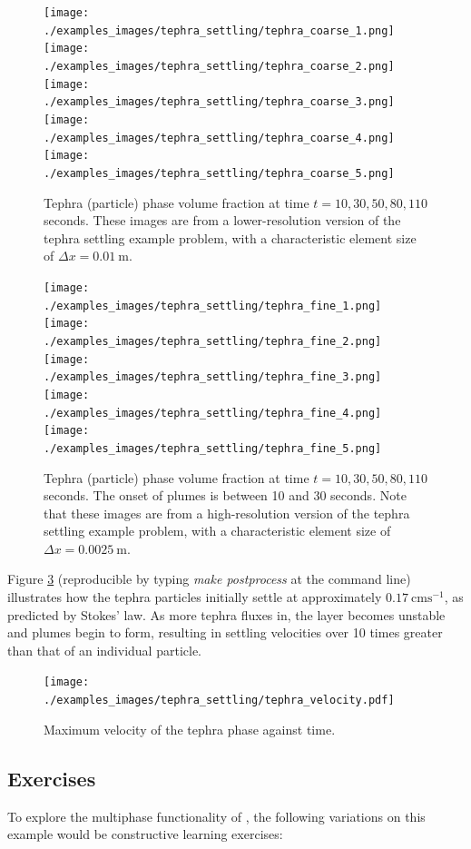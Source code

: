 \begin{figure}[H]
	\centering
	      \texttt{[image: ./examples\_images/tephra\_settling/tephra\_coarse\_1.png]}
	      \texttt{[image: ./examples\_images/tephra\_settling/tephra\_coarse\_2.png]}
	      \texttt{[image: ./examples\_images/tephra\_settling/tephra\_coarse\_3.png]}
	      \texttt{[image: ./examples\_images/tephra\_settling/tephra\_coarse\_4.png]}
	      \texttt{[image: ./examples\_images/tephra\_settling/tephra\_coarse\_5.png]}
   \caption{Tephra (particle) phase volume fraction at time $t = 10, 30, 50, 80, 110$ seconds. These images are from a lower-resolution version of the tephra settling example problem, with a characteristic element size of $\Delta x = 0.01\ \mathrm{m}$.}
   \label{fig:tephra_settling_coarse}
\end{figure}

\begin{figure}[H]
	\centering
	      \texttt{[image: ./examples\_images/tephra\_settling/tephra\_fine\_1.png]}
	      \texttt{[image: ./examples\_images/tephra\_settling/tephra\_fine\_2.png]}
	      \texttt{[image: ./examples\_images/tephra\_settling/tephra\_fine\_3.png]}
	      \texttt{[image: ./examples\_images/tephra\_settling/tephra\_fine\_4.png]}
	      \texttt{[image: ./examples\_images/tephra\_settling/tephra\_fine\_5.png]}
   \caption{Tephra (particle) phase volume fraction at time $t = 10, 30, 50, 80, 110$ seconds. The onset of plumes is between 10 and 30 seconds. Note that these images are from a high-resolution version of the tephra settling example problem, with a characteristic element size of $\Delta x = 0.0025\ \mathrm{m}$.}
   \label{fig:tephra_settling_fine}
\end{figure}

Figure \ref{fig:tephra_settling_velocity} (reproducible by typing \textit{make postprocess} at the command line) illustrates how the tephra particles initially settle at approximately $0.17\ \mathrm{cms^{-1}}$, as predicted by Stokes' law. As more tephra fluxes in, the layer becomes unstable and plumes begin to form, resulting in settling velocities over 10 times greater than that of an individual particle.

\begin{figure}[H]
	\centering
	      \texttt{[image: ./examples\_images/tephra\_settling/tephra\_velocity.pdf]}
   \caption{Maximum velocity of the tephra phase against time.}
   \label{fig:tephra_settling_velocity}
\end{figure}

\subsection{Exercises}
To explore the multiphase functionality of \fluidity, the following variations on this example would be constructive learning exercises:

